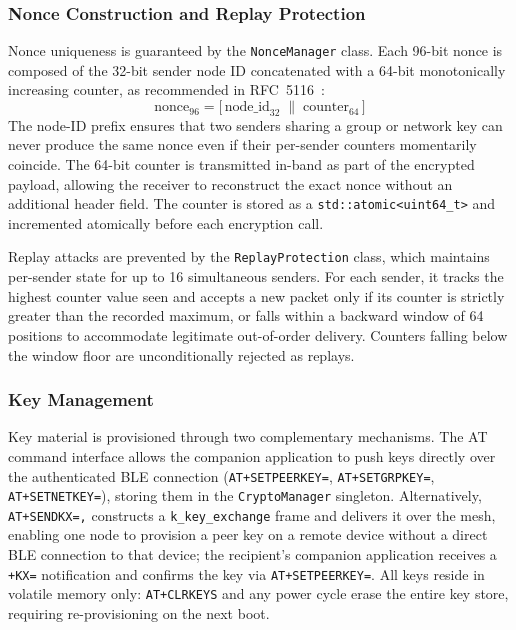 \documentclass[english,bachelor]{tfgitic}[2026/01/22]
\begin{document}
\subsubsection{Nonce Construction and Replay Protection}
\label{sec:fw_nonce}

Nonce uniqueness is guaranteed by the \texttt{NonceManager} class. Each 96-bit nonce
is composed of the 32-bit sender node ID concatenated with a 64-bit monotonically
increasing counter, as recommended in RFC~5116~\cite{rfc5116}:
\[
    \text{nonce}_{96} =
    \bigl[\,\text{node\_id}_{32}\;\|\;\text{counter}_{64}\,\bigr]
\]
The node-ID prefix ensures that two senders sharing a group or network key can never
produce the same nonce even if their per-sender counters momentarily coincide. The
64-bit counter is transmitted in-band as part of the encrypted payload, allowing the
receiver to reconstruct the exact nonce without an additional header field. The
counter is stored as a \texttt{std::atomic<uint64\_t>} and incremented atomically
before each encryption call.

Replay attacks are prevented by the \texttt{ReplayProtection} class, which maintains
per-sender state for up to 16 simultaneous senders. For each sender, it tracks the
highest counter value seen and accepts a new packet only if its counter is strictly
greater than the recorded maximum, or falls within a backward window of 64 positions
to accommodate legitimate out-of-order delivery. Counters falling below the window
floor are unconditionally rejected as replays.

\subsubsection{Key Management}
\label{sec:fw_keymgmt}

Key material is provisioned through two complementary mechanisms. The AT command
interface allows the companion application to push keys directly over the authenticated
BLE connection (\texttt{AT+SETPEERKEY=}, \texttt{AT+SETGRPKEY=},
\texttt{AT+SETNETKEY=}), storing them in the \texttt{CryptoManager} singleton.
Alternatively, \texttt{AT+SENDKX=,} constructs a
\texttt{k\_key\_exchange} frame and delivers it over the mesh, enabling one node to
provision a peer key on a remote device without a direct BLE connection to that device;
the recipient's companion application receives a \texttt{+KX=} notification and
confirms the key via \texttt{AT+SETPEERKEY=}. All keys reside in volatile memory only:
\texttt{AT+CLRKEYS} and any power cycle erase the entire key store, requiring
re-provisioning on the next boot.
\end{document}
